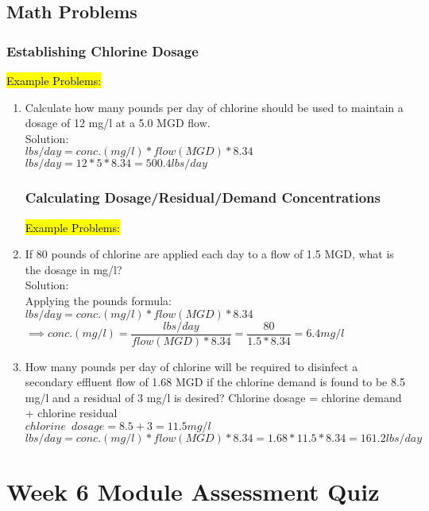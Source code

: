 \section{Math Problems}

\subsection{Establishing Chlorine Dosage}

\hl{Example Problems:}
\begin{enumerate}
\item Calculate how many pounds per day of chlorine should be used to maintain a dosage of 12 mg/l at a 5.0 MGD flow.\\
Solution:\\
$lbs/day=conc. (mg/l)*flow(MGD)*8.34$\\
$lbs/day=12*5*8.34=\boxed{500.4lbs/day}$\\

\subsection{Calculating Dosage/Residual/Demand Concentrations}

\hl{Example Problems:}
\item If 80 pounds of chlorine are applied each day to a flow of 1.5 MGD, what is the dosage in mg/l?\\
Solution:\\
Applying the pounds formula:\\  $lbs/day=conc. (mg/l)*flow(MGD)*8.34$\\
$\implies conc. (mg/l)=\dfrac{lbs/day}{flow(MGD)*8.34}=\dfrac{80}{1.5*8.34}=\boxed{6.4mg/l}$

\item How many pounds per day of chlorine will be required to disinfect a secondary effluent flow of 1.68 MGD if the chlorine demand is found to be 8.5 mg/l and a residual of 3 mg/l is desired?
Chlorine dosage = chlorine demand + chlorine residual\\
$chlorine \enspace dosage=8.5+3=11.5mg/l$\\
$lbs/day=conc. (mg/l)*flow(MGD)*8.34=1.68*11.5*8.34=\boxed{161.2lbs/day}$\\
\end{enumerate}


\newpage
{}
\chapter{Week 6 Module Assessment Quiz}



